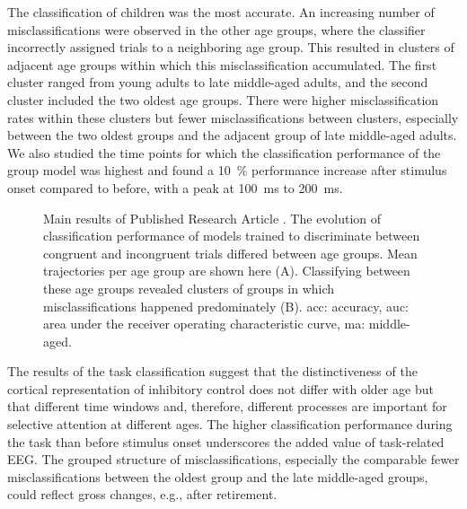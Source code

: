 The classification of children was the most accurate. An increasing number of misclassifications were observed in the other age groups, where the classifier incorrectly assigned trials to a neighboring age group. This resulted in clusters of adjacent age groups within which this misclassification accumulated. The first cluster ranged from young adults to late middle-aged adults, and the second cluster included the two oldest age groups. There were higher misclassification rates within these clusters but fewer misclassifications between clusters, especially between the two oldest groups and the adjacent group of late middle-aged adults.\\
We also studied the time points for which the classification performance of the group model was highest and found a 10~\% performance increase after stimulus onset compared to before, with a peak at 100~ms to 200~ms.

\begin{figure}[h]

\captionsetup{justification=justified}
\caption[Main results of Published Research Article .]{Main results of Published Research Article . The evolution of classification performance of models trained to discriminate between congruent and incongruent trials differed between age groups. Mean trajectories per age group are shown here (A). Classifying between these age groups revealed clusters of groups in which misclassifications happened predominately (B). \gls{acc}: accuracy, \gls{auc}: area under the receiver operating characteristic curve, ma: middle-aged.}
\label{fig:results2}
\end{figure}
\noindent The results of the task classification suggest that the distinctiveness of the cortical representation of inhibitory control does not differ with older age but that different time windows and, therefore, different processes are important for selective attention at different ages. The higher classification performance during the task than before stimulus onset underscores the added value of task-related EEG. The grouped structure of misclassifications,  especially the comparable fewer misclassifications between the oldest group and the late middle-aged groups, could reflect gross changes, e.g., after retirement. 


